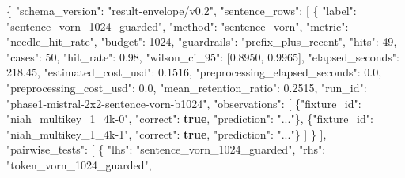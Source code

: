 \documentclass[
]{article}
\newenvironment{Shaded}{}{}
\newcommand{\DataTypeTok}[1]{\textcolor[rgb]{0.56,0.13,0.00}{#1}}
\newcommand{\DecValTok}[1]{\textcolor[rgb]{0.25,0.63,0.44}{#1}}
\newcommand{\FloatTok}[1]{\textcolor[rgb]{0.25,0.63,0.44}{#1}}
\newcommand{\FunctionTok}[1]{\textcolor[rgb]{0.02,0.16,0.49}{#1}}
\newcommand{\KeywordTok}[1]{\textcolor[rgb]{0.00,0.44,0.13}{\textbf{#1}}}
\newcommand{\OtherTok}[1]{\textcolor[rgb]{0.00,0.44,0.13}{#1}}
\newcommand{\StringTok}[1]{\textcolor[rgb]{0.25,0.44,0.63}{#1}}
\begin{document}
\begin{Shaded}
\begin{Highlighting}[]
\FunctionTok{\{}
  \DataTypeTok{"schema\_version"}\FunctionTok{:} \StringTok{"result{-}envelope/v0.2"}\FunctionTok{,}
  \DataTypeTok{"sentence\_rows"}\FunctionTok{:} \OtherTok{[}
    \FunctionTok{\{}
      \DataTypeTok{"label"}\FunctionTok{:} \StringTok{"sentence\_vorn\_1024\_guarded"}\FunctionTok{,}
      \DataTypeTok{"method"}\FunctionTok{:} \StringTok{"sentence\_vorn"}\FunctionTok{,}
      \DataTypeTok{"metric"}\FunctionTok{:} \StringTok{"needle\_hit\_rate"}\FunctionTok{,}
      \DataTypeTok{"budget"}\FunctionTok{:} \DecValTok{1024}\FunctionTok{,}
      \DataTypeTok{"guardrails"}\FunctionTok{:} \StringTok{"prefix\_plus\_recent"}\FunctionTok{,}
      \DataTypeTok{"hits"}\FunctionTok{:} \DecValTok{49}\FunctionTok{,}
      \DataTypeTok{"cases"}\FunctionTok{:} \DecValTok{50}\FunctionTok{,}
      \DataTypeTok{"hit\_rate"}\FunctionTok{:} \FloatTok{0.98}\FunctionTok{,}
      \DataTypeTok{"wilson\_ci\_95"}\FunctionTok{:} \OtherTok{[}\FloatTok{0.8950}\OtherTok{,} \FloatTok{0.9965}\OtherTok{]}\FunctionTok{,}
      \DataTypeTok{"elapsed\_seconds"}\FunctionTok{:} \FloatTok{218.45}\FunctionTok{,}
      \DataTypeTok{"estimated\_cost\_usd"}\FunctionTok{:} \FloatTok{0.1516}\FunctionTok{,}
      \DataTypeTok{"preprocessing\_elapsed\_seconds"}\FunctionTok{:} \FloatTok{0.0}\FunctionTok{,}
      \DataTypeTok{"preprocessing\_cost\_usd"}\FunctionTok{:} \FloatTok{0.0}\FunctionTok{,}
      \DataTypeTok{"mean\_retention\_ratio"}\FunctionTok{:} \FloatTok{0.2515}\FunctionTok{,}
      \DataTypeTok{"run\_id"}\FunctionTok{:} \StringTok{"phase1{-}mistral{-}2x2{-}sentence{-}vorn{-}b1024"}\FunctionTok{,}
      \DataTypeTok{"observations"}\FunctionTok{:} \OtherTok{[}
        \FunctionTok{\{}\DataTypeTok{"fixture\_id"}\FunctionTok{:} \StringTok{"niah\_multikey\_1\_4k{-}0"}\FunctionTok{,} \DataTypeTok{"correct"}\FunctionTok{:} \KeywordTok{true}\FunctionTok{,} \DataTypeTok{"prediction"}\FunctionTok{:} \StringTok{"..."}\FunctionTok{\}}\OtherTok{,}
        \FunctionTok{\{}\DataTypeTok{"fixture\_id"}\FunctionTok{:} \StringTok{"niah\_multikey\_1\_4k{-}1"}\FunctionTok{,} \DataTypeTok{"correct"}\FunctionTok{:} \KeywordTok{true}\FunctionTok{,} \DataTypeTok{"prediction"}\FunctionTok{:} \StringTok{"..."}\FunctionTok{\}}
      \OtherTok{]}
    \FunctionTok{\}}
  \OtherTok{]}\FunctionTok{,}
  \DataTypeTok{"pairwise\_tests"}\FunctionTok{:} \OtherTok{[}
    \FunctionTok{\{}
      \DataTypeTok{"lhs"}\FunctionTok{:} \StringTok{"sentence\_vorn\_1024\_guarded"}\FunctionTok{,}
      \DataTypeTok{"rhs"}\FunctionTok{:} \StringTok{"token\_vorn\_1024\_guarded"}\FunctionTok{,}

\end{Highlighting}
\end{Shaded}
\end{document}
